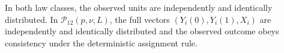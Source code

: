 In both law classes, the observed units are independently and identically distributed.  In \(\mathcal P_{12}(p,\nu,L)\), the full vectors \((Y_i(0),Y_i(1),X_i)\) are independently and identically distributed and the observed outcome obeys consistency under the deterministic assignment rule.